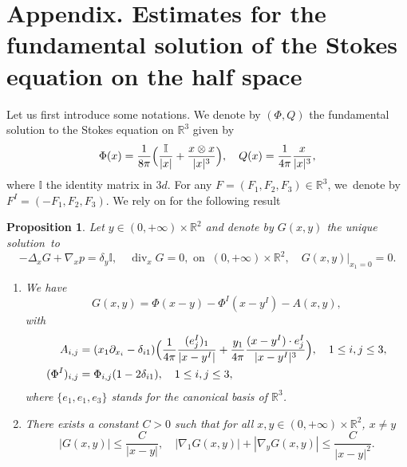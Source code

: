 \documentclass[10pt]{amsart}
\renewcommand{\div}{\operatorname{div}}
\theoremstyle{plain}
\newtheorem{prop}[thm]{Proposition}
\theoremstyle{definition}
\newcommand{\R}{\mathbb{R}}
\begin{document}
\section*{Appendix. Estimates for the fundamental solution of the Stokes equation on the half space}
\label{appendix}
Let us first introduce some notations. We denote by $(\Phi,Q)$ the fundamental solution to the Stokes equation on $\R^3$ given by
\[
\Phi(x)=\frac{1}{8\pi}\Bigl(\frac{\mathbb{I}}{|x|}+\frac{x\otimes x}{|x|^3} \Bigr),\quad Q(x)=\frac{1}{4\pi} \frac{x}{|x|^3},
\]
where $\mathbb{I}$ the identity matrix in $3d$. For any $F=(F_1,F_2,F_3) \in \R^3$, we~denote by $F^I=(-F_1,F_2,F_3)$.
We rely on \cite[\S 3.1]{Gimbutas_Greengard_Veerapaneni_2015} for the following result
\begin{prop}\label{prop_appendix}
Let $y \!\in\! (0,+\infty)\times \R^2$ and denote by $G(x,y)$ the unique solution~to
\[
-\Delta_x G+\nabla_x p = \delta_{y} \mathbb{I}, \quad \div_x G= 0, \text{ on } \: (0,+\infty)\times \R^2, \quad G(x,y)\vert_{x_1=0}=0.
\]
\begin{enumerate}
\item We have
\[
G(x,y)=\Phi(x-y)-\Phi^I(x-y^I)-A(x,y),
\]
with
\begin{align*}
A_{i,j} &= (x_1 \partial_{x_i}-\delta_{i1})\Bigl(\frac{1}{4\pi}\frac{(e_j^I)_1}{|x-y^I|}+\frac{y_1}{4\pi} \frac{(x-y^I)\cdot e_j^I}{|x-y^I|^3} \Bigr), \quad 1 \leq i,j\leq 3,\\
(\Phi^I)_{i,j}&=\Phi_{i,j}(1-2\delta_{i1}), \quad 1 \leq i,j\leq 3,
\end{align*}
where $\{e_1,e_1,e_3\}$ stands for the canonical basis of $\R^3$.
\item There exists a constant $C>0$ such that for all $x,y \in (0,+\infty)\times \R^2 $, $x\neq y$
\[
|G(x,y)| \leq \frac{C}{|x-y|}, \quad | \nabla_1 G(x,y)| + | \nabla_y G(x,y)| \leq \frac{C}{|x-y|^2}.
\]
\end{enumerate}
\end{prop}
\end{document}
